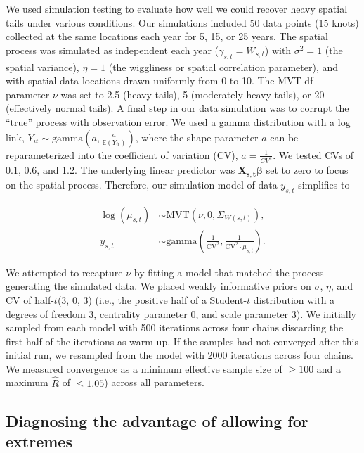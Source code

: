 \documentclass[12pt,english]{article}
\begin{document}
\begin{spacing}{1.9}
We used simulation testing to evaluate how well we could recover
heavy spatial tails under various conditions.
Our simulations included 50 data points (15 knots) collected at the same
locations each year for 5, 15, or 25 years. The spatial process was simulated
as independent each year ($\gamma_{s,t} = W_{s,t}$) with $\sigma^2 = 1$
(the spatial variance),
$\eta = 1$ (the wiggliness or spatial correlation parameter), and
with spatial data locations drawn uniformly from 0 to 10.
The MVT df parameter $\nu$ was set to 2.5 (heavy tails), 5 (moderately
heavy tails), or 20 (effectively normal tails). A final step in our data
simulation was to corrupt the ``true'' process with observation error. We used a gamma
distribution with a log link, $Y_{it}\sim \mathrm{gamma}\left(a,\frac
  {a}{\mathbb{E}(Y_{it})} \right)$, where the shape parameter $a$ can be
reparameterized into the coefficient of variation (CV), $a=\frac{1}{CV^2}$. We
tested CVs of 0.1, 0.6, and 1.2. The underlying linear predictor was
$\bm{X_{s,t}} \bm{\beta}$ set to zero to focus on the spatial process. Therefore,
our simulation model of data $y_{s,t}$ simplifies to

\begin{align}
  \log(\mu_{s,t}) &\sim \mathrm{MVT}\left(\nu, 0, \Sigma_{W(s,t)}\right),\\
  y_{s,t} &\sim \mathrm{gamma} \left( \frac{1}{\mathrm{CV}^2},
  \frac{1}{\mathrm{CV}^2 \cdot \mu_{s,t} } \right).
\end{align}


We attempted to recapture $\nu$ by fitting a model that matched the process
generating the simulated data.
We placed weakly informative priors on $\sigma$,
$\eta$, and CV of half-$t$(3, 0, 3) (i.e., the positive half of a Student-$t$
distribution with a degrees of freedom 3, centrality parameter 0, and scale
parameter 3). We initially sampled from each model with 500 iterations across
four chains discarding the first half of the iterations as warm-up. If the
samples had not converged after this initial run, we resampled from the model
with 2000 iterations across four chains. We measured convergence as a minimum
effective sample size of $\ge 100$ and a maximum $\hat{R}$ of $\le 1.05$)
across all parameters.

\subsection{Diagnosing the advantage of allowing for extremes}


\end{spacing}
\end{document}
